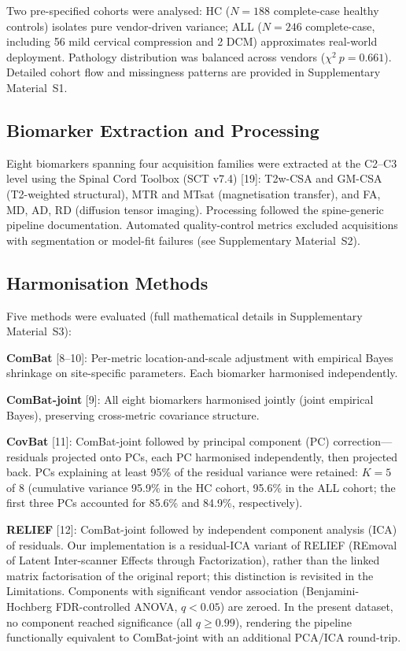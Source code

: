 \documentclass[12pt,a4paper]{article}
\begin{document}
Two pre-specified cohorts were analysed: HC ($N=188$ complete-case healthy controls) isolates pure vendor-driven variance; ALL ($N=246$ complete-case, including 56 mild cervical compression and 2 DCM) approximates real-world deployment. Pathology distribution was balanced across vendors ($\chi^2\ p=0.661$). Detailed cohort flow and missingness patterns are provided in Supplementary Material~S1.

\subsection{Biomarker Extraction and Processing}

Eight biomarkers spanning four acquisition families were extracted at the C2--C3 level using the Spinal Cord Toolbox (SCT v7.4) [19]: T2w-CSA and GM-CSA (T2-weighted structural), MTR and MTsat (magnetisation transfer), and FA, MD, AD, RD (diffusion tensor imaging). Processing followed the spine-generic pipeline documentation. Automated quality-control metrics excluded acquisitions with segmentation or model-fit failures (see Supplementary Material~S2).

\subsection{Harmonisation Methods}

Five methods were evaluated (full mathematical details in Supplementary Material~S3):

\textbf{ComBat} [8--10]: Per-metric location-and-scale adjustment with empirical Bayes shrinkage on site-specific parameters. Each biomarker harmonised independently.

\textbf{ComBat-joint} [9]: All eight biomarkers harmonised jointly (joint empirical Bayes), preserving cross-metric covariance structure.

\textbf{CovBat} [11]: ComBat-joint followed by principal component (PC) correction---residuals projected onto PCs, each PC harmonised independently, then projected back. PCs explaining at least 95\% of the residual variance were retained: $K=5$ of 8 (cumulative variance 95.9\% in the HC cohort, 95.6\% in the ALL cohort; the first three PCs accounted for 85.6\% and 84.9\%, respectively).

\textbf{RELIEF} [12]: ComBat-joint followed by independent component analysis (ICA) of residuals. Our implementation is a residual-ICA variant of RELIEF (REmoval of Latent Inter-scanner Effects through Factorization), rather than the linked matrix factorisation of the original report; this distinction is revisited in the Limitations. Components with significant vendor association (Benjamini-Hochberg FDR-controlled ANOVA, $q<0.05$) are zeroed. In the present dataset, no component reached significance (all $q\geq0.99$), rendering the pipeline functionally equivalent to ComBat-joint with an additional PCA/ICA round-trip.
\end{document}

